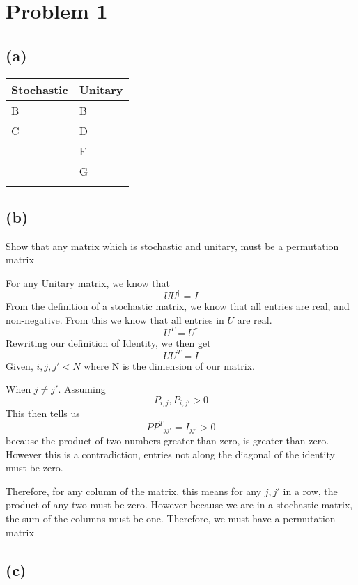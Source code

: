 \documentclass[]{article}
\begin{document}
\hypertarget{problem-1}{%
\section{Problem 1}\label{problem-1}}

\hypertarget{a}{%
\subsection{(a)}\label{a}}

\begin{longtable}[]{@{}ll@{}}
\toprule\noalign{}
Stochastic & Unitary \\
\midrule\noalign{}
\endhead
\bottomrule\noalign{}
\endlastfoot
B & B \\
C & D \\
& F \\
& G \\
& \\
\end{longtable}

\hypertarget{b}{%
\subsection{\texorpdfstring{\textbf{(b)}}{(b)}}\label{b}}

Show that any matrix which is stochastic and unitary, must be a
permutation matrix

For any Unitary matrix, we know that \[
UU^{\dagger}=I
\] From the definition of a stochastic matrix, we know that all entries
are real, and non-negative. From this we know that all entries in \(U\)
are real. \[
U^{T} = U^{\dagger}
\] Rewriting our definition of Identity, we then get \[
UU^{T} = I
\] Given, \(i,j,j'<N\) where N is the dimension of our matrix.

When \(j\neq j'\). Assuming \[
P_{i,j},P_{i,j'}> 0
\] This then tells us \[
{PP^{T}}_{jj'}=I_{jj'}> 0
\] because the product of two numbers greater than zero, is greater than
zero. However this is a contradiction, entries not along the diagonal of
the identity must be zero.

Therefore, for any column of the matrix, this means for any \(j,j'\) in
a row, the product of any two must be zero. However because we are in a
stochastic matrix, the sum of the columns must be one. Therefore, we
must have a permutation matrix

\hypertarget{c}{%
\subsection{(c)}\label{c}}
\end{document}
